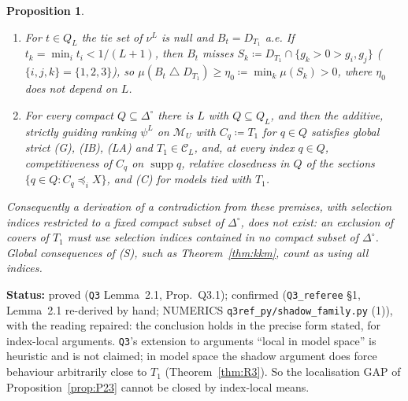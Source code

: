 \documentclass[11pt]{article}
\newtheorem{proposition}[theorem]{Proposition}
\theoremstyle{definition}
\theoremstyle{remark}
\newcommand{\Di}{\Delta^{\circ}}
\newcommand{\M}{\mathcal M}
\newcommand{\C}{\mathcal C}
\newcommand{\supp}{\operatorname{supp}}
\newcommand{\sd}{\mathbin{\triangle}}
\newcommand{\src}[1]{\texttt{#1}}
\newcommand{\status}[1]{\par\smallskip\noindent\textbf{Status:} #1\par\smallskip}
\begin{document}
\begin{proposition}\label{prop:Q31}
\begin{enumerate}[leftmargin=*,label=(\alph*)]
\item For $t\in Q_L$ the tie set of $\nu^L$ is null and $B_t=D_{T_1}$ a.e. If $t_k=\min_it_i<1/(L+1)$, then $B_t$ misses $S_k\coloneqq D_{T_1}\cap\{g_k>0>g_i,g_j\}$ ($\{i,j,k\}=\{1,2,3\}$), so $\mu(B_t\sd D_{T_1})\ge\eta_0\coloneqq\min_k\mu(S_k)>0$, where $\eta_0$ does not depend on $L$.
\item For every compact $Q\subseteq\Di$ there is $L$ with $Q\subseteq Q_L$, and then the additive, strictly guiding ranking $\psi^L$ on $\M_U$ with $C_q\coloneqq T_1$ for $q\in Q$ satisfies global strict (G), (IB), (LA) and $T_1\in\C_L$, and, at every index $q\in Q$, competitiveness of $C_q$ on $\supp q$, relative closedness in $Q$ of the sections $\{q\in Q:C_q\preceq_iX\}$, and (C) for models tied with $T_1$.
\end{enumerate}
Consequently a derivation of a contradiction from these premises, with selection indices restricted to a fixed compact subset of $\Di$, does not exist: an exclusion of covers of $T_1$ must use selection indices contained in no compact subset of $\Di$. Global consequences of (S), such as Theorem~\ref{thm:kkm}, count as using all indices.
\end{proposition}
\status{proved (\src{Q3} Lemma~2.1, Prop.~Q3.1); confirmed (\src{Q3\_referee} \S1, Lemma~2.1 re-derived by hand; NUMERICS \src{q3ref\_py/shadow\_family.py} (1)), with the reading repaired: the conclusion holds in the precise form stated, for index-local arguments. \src{Q3}'s extension to arguments ``local in model space'' is heuristic and is not claimed; in model space the shadow argument does force behaviour arbitrarily close to $T_1$ (Theorem~\ref{thm:R3}). So the localisation GAP of Proposition~\ref{prop:P23} cannot be closed by index-local means.}
\end{document}
